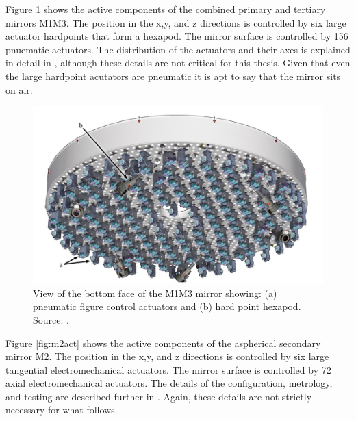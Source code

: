 Figure \ref{fig:m1m3act} shows the active components of the combined primary and tertiary mirrors M1M3. The position in the x,y, and z directions is controlled by six large actuator hardpoints that form a hexapod. The mirror surface is controlled by 156 pnuematic actuators. The distribution of the actuators and their axes is explained in detail in \cite{2016SPIE.9906E..0QN}, although these details are not critical for this thesis. Given that even the large hardpoint acutators are pneumatic it is apt to say that the mirror sits on air. 

\begin{figure}[hbt!]
\centering
\includegraphics[width=14cm, keepaspectratio]{figs/rubin_telescope_and_aos/M1M3actuators.png}
\caption[Rubin M1M3 Hexapod and Pneumatic Actuators]{View of the bottom face of the M1M3 mirror showing: (a) pneumatic figure control actuators and (b) hard point hexapod. Source: \cite{2016SPIE.9906E..0QN}.}
\label{fig:m1m3act}
\end{figure}

Figure \ref{fig:m2act} shows the active components of the aspherical secondary mirror M2. The position in the x,y, and z directions is controlled by six large tangential electromechanical actuators. The mirror surface is controlled by 72 axial electromechanical actuators. The details of the configuration, metrology, and testing are described further in \cite{2016SPIE.9906E..67N}. Again, these details are not strictly necessary for what follows.

